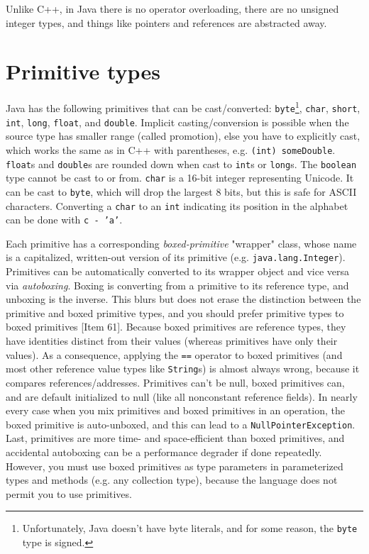 \documentclass[table, xcdraw]{article}%
\begin{document}
Unlike C++, in Java there is no operator overloading, there are no unsigned integer types, and things like pointers and references are abstracted away.

\section{Primitive types}

Java has the following primitives that can be cast/converted: \texttt{byte}\footnote{Unfortunately, Java doesn't have byte literals, and for some reason, the \texttt{byte} type is signed.}, \texttt{char}, \texttt{short}, \texttt{int}, \texttt{long}, \texttt{float}, and \texttt{double}. Implicit casting/conversion is possible when the source type has smaller range (called promotion), else you have to explicitly cast, which works the same as in C++ with parentheses, e.g. \texttt{(int) someDouble}. \texttt{float}s and \texttt{double}s are rounded down when cast to \texttt{int}s or \texttt{long}s. The \texttt{boolean} type cannot be cast to or from. \texttt{char} is a 16-bit integer representing Unicode. It can be cast to \texttt{byte}, which will drop the largest 8 bits, but this is safe for ASCII characters. Converting a \texttt{char} to an \texttt{int} indicating its position in the alphabet can be done with \texttt{c - 'a'}.

Each primitive has a corresponding \emph{boxed-primitive} "wrapper" class, whose name is a capitalized, written-out version of its primitive (e.g. \texttt{java.lang.Integer}). Primitives can be automatically converted to its wrapper object and vice versa via \emph{autoboxing}. Boxing is converting from a primitive to its reference type, and unboxing is the inverse. This blurs but does not erase the distinction between the primitive and boxed primitive types, and you should prefer primitive types to boxed primitives [Item 61]. Because boxed primitives are reference types, they have identities distinct from their values (whereas primitives have only their values). As a consequence, applying the \texttt{==} operator to boxed primitives (and most other reference value types like \texttt{String}s) is almost always wrong, because it compares references/addresses. Primitives can't be null, boxed primitives can, and are default initialized to null (like all nonconstant reference fields). In nearly every case when you mix primitives and boxed primitives in an operation, the boxed primitive is auto-unboxed, and this can lead to a \texttt{NullPointerException}. Last, primitives are more time- and space-efficient than boxed primitives, and accidental autoboxing can be a performance degrader if done repeatedly. However, you must use boxed primitives as type parameters in parameterized types and methods (e.g. any collection type), because the language does not permit you to use primitives.
 
\end{document}
